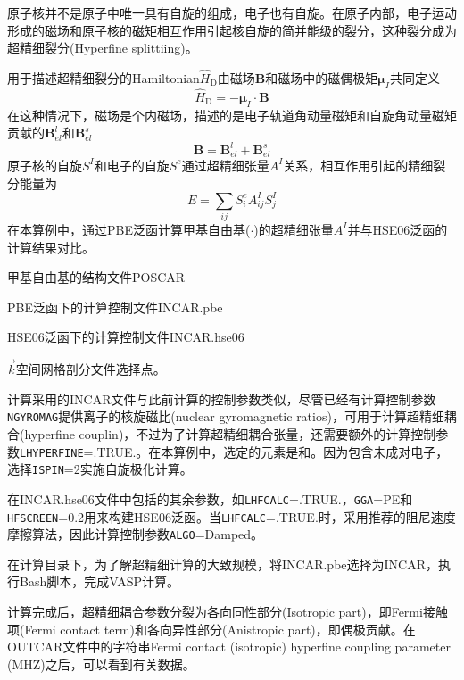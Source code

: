 原子核并不是原子中唯一具有自旋的组成，电子也有自旋。在原子内部，电子运动形成的磁场和原子核的磁矩相互作用引起核自旋的简并能级的裂分，这种裂分成为超精细裂分\textrm{(Hyperfine splittiing)}。

用于描述超精细裂分的\textrm{Hamiltonian}$\hat{H}_{\mathrm{D}}$由磁场$\mathbf{B}$和磁场中的磁偶极矩$\mathbf{\mu}_I$共同定义
\begin{displaymath}
	\hat{H}_{\mathrm{D}}=-\mathbf{\mu}_I\cdot\mathbf{B}
\end{displaymath}
在这种情况下，磁场是个内磁场，描述的是电子轨道角动量磁矩和自旋角动量磁矩贡献的$\mathbf{B}_{el}^l$和$\mathbf{B}_{el}^s$
\begin{displaymath}
	\mathbf{B}=\mathbf{B}_{el}^l+\mathbf{B}_{el}^s
\end{displaymath}
原子核的自旋$S^I$和电子的自旋$S^e$通过超精细张量$A^I$关系，相互作用引起的精细裂分能量为
\begin{displaymath}
	E=\sum_{ij}S_i^eA_{ij}^IS_j^I
\end{displaymath}
在本算例中，通过\textrm{PBE}泛函计算甲基自由基($\cdot$)的超精细张量$A^I$并与\textrm{HSE06}泛函的计算结果对比。

甲基自由基的结构文件\textrm{POSCAR}

\textrm{PBE}泛函下的计算控制文件\textrm{INCAR.pbe}

\textrm{HSE06}泛函下的计算控制文件\textrm{INCAR.hse06}

$\vec k$空间网格剖分文件选择\textrm{\Gamma}点。

计算采用的\textrm{INCAR}文件与此前计算的控制参数类似，尽管已经有计算控制参数\texttt{NGYROMAG}提供离子的核旋磁比\textrm{(nuclear gyromagnetic ratios)}，可用于计算超精细耦合\textrm{(hyperfine couplin)}，不过为了计算超精细耦合张量，还需要额外的计算控制参数\texttt{LHYPERFINE}=\textrm{.TRUE.}。在本算例中，选定的元素是和。因为包含未成对电子，选择\texttt{ISPIN}=2实施自旋极化计算。

在\textrm{INCAR.hse06}文件中包括的其余参数，如\texttt{LHFCALC}=\textrm{.TRUE.}，\texttt{GGA}=\textrm{PE}和\texttt{HFSCREEN}=0.2用来构建\textrm{HSE06}泛函。当\texttt{LHFCALC}=\textrm{.TRUE.}时，采用推荐的阻尼速度摩擦算法，因此计算控制参数\texttt{ALGO}=\textrm{Damped}。

在计算目录下，为了解超精细计算的大致规模，将\textrm{INCAR.pbe}选择为\textrm{INCAR}，执行\textrm{Bash}脚本，完成\textrm{VASP}计算。

计算完成后，超精细耦合参数分裂为各向同性部分\textrm{(Isotropic part)}，即\textrm{Fermi}接触项\textrm{(Fermi contact term)}和各向异性部分\textrm{(Anistropic part)}，即偶极贡献。在\textrm{OUTCAR}文件中的字符串\textrm{Fermi contact (isotropic) hyperfine coupling parameter (MHZ)}之后，可以看到有关数据。

